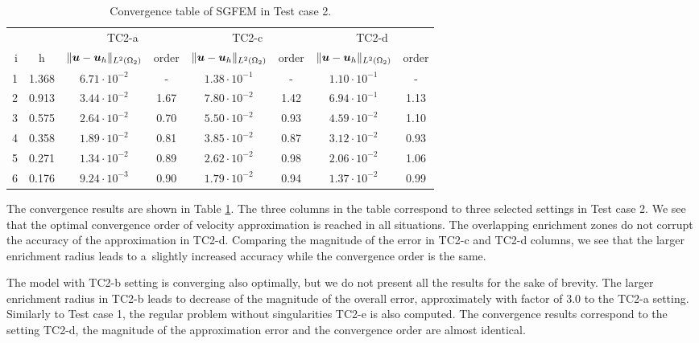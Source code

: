 \begin{table}[!htb]
\begin{center}
\bgroup
\def\arraystretch{1.2}
\setlength\tabcolsep{5pt}
\begin{tabular}{rc|cc|cc|cc}
\toprule
\multicolumn{2}{c|}{} & \multicolumn{2}{c|}{ TC2-a } & \multicolumn{2}{c|}{ TC2-c } & \multicolumn{2}{c}{TC2-d}\\ [3pt] %
i & h & $\|\mathbf{\boldsymbol{u}}-\mathbf{\boldsymbol{u}}_h\|_{L^2(\Omega_2)}$ & order & $\|\mathbf{\boldsymbol{u}}-\mathbf{\boldsymbol{u}}_h\|_{L^2(\Omega_2)}$
    & order & $\|\mathbf{\boldsymbol{u}}-\mathbf{\boldsymbol{u}}_h\|_{L^2(\Omega_2)}$ & order \\ [3pt] \midrule
1 & 1.368 &  $6.71\cdot10^{-2}$  &  -   &  $1.38\cdot10^{-1}$  &  -   &  $1.10\cdot10^{-1}$ &   -   \\
2 & 0.913 &  $3.44\cdot10^{-2}$  & 1.67 &  $7.80\cdot10^{-2}$  & 1.42 &  $6.94\cdot10^{-1}$ &  1.13 \\
3 & 0.575 &  $2.64\cdot10^{-2}$  & 0.70 &  $5.50\cdot10^{-2}$  & 0.93 &  $4.59\cdot10^{-2}$ &  1.10 \\
4 & 0.358 &  $1.89\cdot10^{-2}$  & 0.81 &  $3.85\cdot10^{-2}$  & 0.87 &  $3.12\cdot10^{-2}$ &  0.93 \\
5 & 0.271 &  $1.34\cdot10^{-2}$  & 0.89 &  $2.62\cdot10^{-2}$  & 0.98 &  $2.06\cdot10^{-2}$ &  1.06 \\
6 & 0.176 &  $9.24\cdot10^{-3}$  & 0.90 &  $1.79\cdot10^{-2}$  & 0.94 &  $1.37\cdot10^{-2}$ &  0.99 \\
\bottomrule
\end{tabular}
\caption{Convergence table of SGFEM in Test case 2.}
\label{tab:mh_tc2_convergence}
\egroup
\end{center}
\end{table}

The convergence results are shown in Table \ref{tab:mh_tc2_convergence}.
The three columns in the table correspond to three selected settings in Test case 2.
We see that the optimal convergence order of velocity approximation is reached in all situations.
The overlapping enrichment zones do not corrupt the accuracy of the approximation in TC2-d.
Comparing the magnitude of the error in TC2-c and TC2-d columns, we see that the larger enrichment radius leads
to a~slightly increased accuracy while the convergence order is the same.

The model with TC2-b setting is converging also optimally, but we do not present all the results for the sake of brevity.
The larger enrichment radius in TC2-b leads to decrease of the magnitude of the overall error,
approximately with factor of 3.0 to the TC2-a setting.
Similarly to Test case 1, the regular problem without singularities TC2-e is also computed.
The convergence results correspond to the setting TC2-d,
the magnitude of the approximation error and the convergence order are almost identical.

